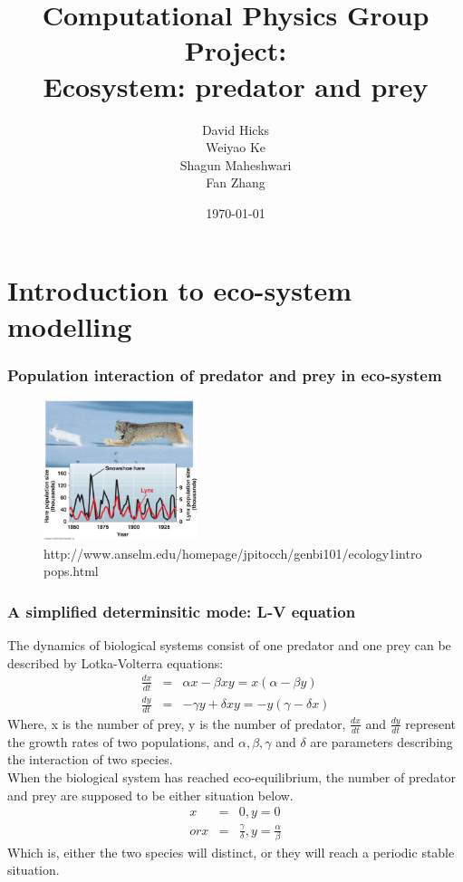 \documentclass{beamer}
\title{Computational Physics Group Project: \\ Ecosystem: predator and prey}
\author{David Hicks\\ Weiyao Ke \\ Shagun Maheshwari \\ Fan Zhang}
\date{\today}
\begin{document}
\frame{\titlepage}

\section[Outline]{}
\frame{\tableofcontents}

\section{Introduction to eco-system modelling}

\frame
{
 	\frametitle{Population interaction of predator and prey in eco-system}
 
	\begin{figure}[htbp]
	\begin{center}
		\includegraphics[width=0.4\textwidth]{./pics/predator_prey2.jpeg}
	\caption{http://www.anselm.edu/homepage/jpitocch/genbi101/ecology1intropops.html}
	\label{default}
	\end{center}
	\end{figure}  
}

\frame
{
 \frametitle{A simplified determinsitic mode: L-V equation}
 The dynamics of biological systems consist of one predator and one prey can be described by Lotka-Volterra equations:
 \begin{eqnarray*}
 \frac{dx}{dt} &=& \alpha x - \beta x y = x(\alpha - \beta y) \\
 \frac{dy}{dt} &=& - \gamma y + \delta x y = - y (\gamma - \delta x)
 \end{eqnarray*}
 Where, x is the number of prey, y is the number of predator, $\frac{dx}{dt}$ and $\frac{dy}{dt}$ represent the growth rates of two populations, and $\alpha, \beta, \gamma$ and $\delta$ are parameters describing the interaction of two species. \\
 When the biological system has reached eco-equilibrium, the number of predator and prey are supposed to be either situation below.
 \begin{eqnarray*}
 x &=& 0, y = 0 \\
 or x &=& \frac{\gamma}{\delta}, y = \frac{\alpha}{\beta}
 \end{eqnarray*}
 Which is, either the two species will distinct, or they will reach a periodic stable situation.
}
\end{document}
